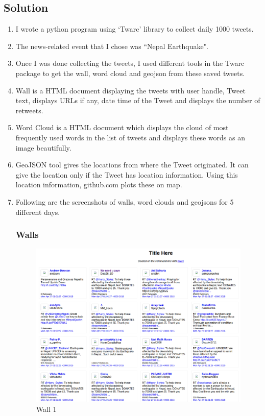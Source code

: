 \subsection{Solution}
\begin{enumerate}

\item I wrote a python program using `Twarc' library to collect daily 1000 tweets.
\item The news-related event that I chose was ``Nepal Earthquake".
\item Once I was done collecting the tweets, I used different tools in the Twarc package to get the wall, word cloud and geojson from these saved tweets.
\item Wall is a HTML document displaying the tweets with user handle, Tweet text, displays URLs if any, date time of the Tweet and displays the number of retweets.
\item Word Cloud is a HTML document which displays the cloud of most frequently used words in the list of tweets and displays these words as an image beautifully.
\item GeoJSON tool gives the locations from where the Tweet originated. It can give the location only if the Tweet has location information. Using this location information, github.com plots these on map.
\item Following are the screenshots of walls, word clouds and geojsons for 5 different days.

\newpage
\subsubsection{Walls}
\begin{figure}[ht]    
    \begin{center}
        \includegraphics[scale=0.40]{graphs/wall1.png}
        \caption{Wall 1}
    \end{center}
\end{figure}


\end{enumerate}
